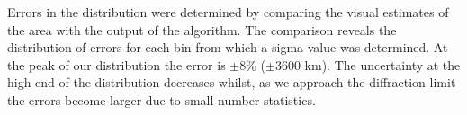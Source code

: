\documentclass{emulateapj}
\begin{document}
Errors in the distribution were determined by comparing the visual estimates of the area with the output of the algorithm. The comparison reveals the  distribution of errors for each bin from which a sigma value was determined. At the peak of our distribution the error is $\pm$8$\%$ ($\pm$3600 km). The uncertainty at the high end of the distribution decreases whilst, as we approach the diffraction limit the errors become larger due to small number statistics.
\end{document}
